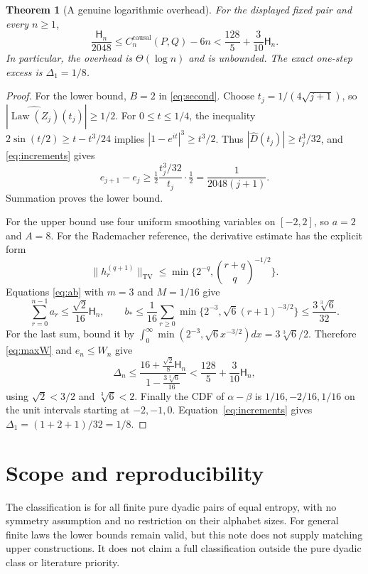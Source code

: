 \documentclass[11pt,a4paper]{article}
\newtheorem{theorem}{Theorem}
\newcommand{\Law}{\operatorname{Law}}
\newcommand{\TV}{\mathrm{TV}}
\begin{document}
\begin{theorem}[A genuine logarithmic overhead]\label{thm:explicit}
For the displayed fixed pair and every $n\ge1$,
\begin{equation}\label{eq:explicit}
\boxed{\frac{\mathsf H_n}{2048}
\le C_n^{\mathrm{causal}}(P,Q)-6n
<\frac{128}{5}+\frac3{10}\mathsf H_n.}
\end{equation}
In particular, the overhead is $\Theta(\log n)$ and is unbounded.
The exact one-step excess is $\Delta_1=1/8$.
\end{theorem}
\begin{proof}
For the lower bound, $B=2$ in \eqref{eq:second}. Choose
$t_j=1/(4\sqrt{j+1})$, so $|\widehat{\Law(Z_j)}(t_j)|\ge1/2$.
For $0\le t\le1/4$, the inequality
$2\sin(t/2)\ge t-t^3/24$ implies
$|1-e^{it}|^3\ge t^3/2$. Thus
$|\widehat D(t_j)|\ge t_j^3/32$, and
\eqref{eq:increments} gives
\[
e_{j+1}-e_j\ge\tfrac12\frac{t_j^3/32}{t_j}\cdot\tfrac12
=\frac1{2048(j+1)}.
\]
Summation proves the lower bound.

For the upper bound use four uniform smoothing variables on $[-2,2]$,
so $a=2$ and $A=8$. For the Rademacher reference, the derivative estimate
has the explicit form
\[
\|h_r^{(q+1)}\|_{\TV}
\le\min\{2^{-q},\binom{r+q}{q}^{-1/2}\}.
\]
Equations \eqref{eq:ab} with $m=3$ and $M=1/16$ give
\[
\sum_{r=0}^{n-1}a_r\le\frac{\sqrt2}{16}\mathsf H_n,
\qquad
b_*\le\frac1{16}\sum_{r\ge0}
\min\{2^{-3},\sqrt6(r+1)^{-3/2}\}
\le\frac{3\sqrt[3]6}{32}.
\]
For the last sum, bound it by
$\int_0^\infty\min(2^{-3},\sqrt6 x^{-3/2})dx
=3\sqrt[3]6/2$.
Therefore \eqref{eq:maxW} and $e_n\le W_n$ give
\[
\Delta_n\le
\frac{16+\frac{\sqrt2}{8}\mathsf H_n}
     {1-\frac{3\sqrt[3]6}{16}}
<\frac{128}{5}+\frac3{10}\mathsf H_n,
\]
using $\sqrt2<3/2$ and $\sqrt[3]6<2$.
Finally the CDF of $\alpha-\beta$ is $1/16,-2/16,1/16$ on the unit
intervals starting at $-2,-1,0$. Equation~\eqref{eq:increments} gives
$\Delta_1=(1+2+1)/32=1/8$.
\end{proof}

\section{Scope and reproducibility}
The classification is for all finite pure dyadic pairs of equal entropy,
with no symmetry assumption and no restriction on their alphabet sizes.
For general finite laws the lower bounds remain valid, but this note
does not supply matching upper constructions. It does not claim a full
classification outside the pure dyadic class or literature priority.
\end{document}
